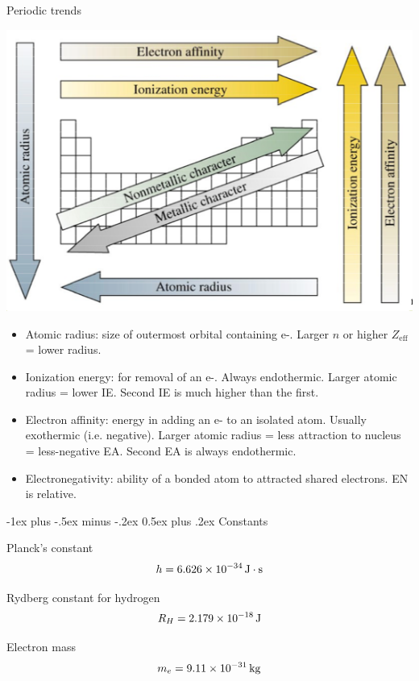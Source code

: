 \documentclass[10pt,landscape]{article}
\makeatletter
\renewcommand{\section}{\@startsection{section}{1}{0mm}%
                                {-1ex plus -.5ex minus -.2ex}%
                                {0.5ex plus .2ex}%
                                {\normalfont\large\bfseries}}
\makeatother
\begin{document}
\begin{multicols}{3}
Periodic trends

\begin{center}
\includegraphics[width=\linewidth]{./chm2311/periodic-table-trends.png}
\end{center}
 
\begin{itemize} 
\item Atomic radius: size of outermost orbital containing e-. Larger $n$ or higher $Z_\text{eff}$ = lower radius.
\item Ionization energy: for removal of an e-. Always endothermic. Larger atomic radius  = lower IE.  Second IE is much higher than the first.
\item Electron affinity: energy in adding an e- to an isolated atom. Usually exothermic (i.e. negative). Larger atomic radius = less attraction to nucleus = less-negative EA. Second EA is always endothermic. 
\item Electronegativity: ability of a bonded atom to attracted shared electrons. EN is relative.
\end{itemize}

\hrulefill


\section{Constants}

Planck's constant
\[ h = \SI{6.626E-34}{\joule\cdot\second} \]
 
 Rydberg constant for hydrogen
 \[ R_H =  \SI{2.179E-18}{\joule} \]
 
Electron mass
\[  m_e = \SI{9,11E-31}{\kilogram} \]


\end{multicols}
\end{document}

